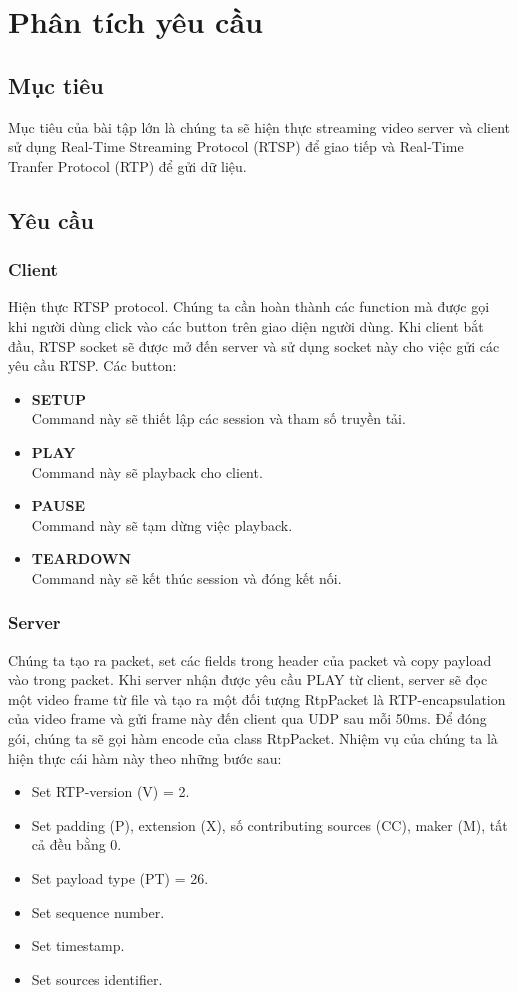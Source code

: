 \documentclass[12pt,a4paper]{article}
\begin{document}
\section{Phân tích yêu cầu}
\subsection{Mục tiêu}
Mục tiêu của bài tập lớn là chúng ta sẽ hiện thực streaming video server và client sử dụng Real-Time Streaming Protocol (RTSP) để giao tiếp và Real-Time Tranfer Protocol (RTP) để gửi dữ liệu.
\subsection{Yêu cầu}
\subsubsection{Client}
Hiện thực RTSP protocol. Chúng ta cần hoàn thành các function mà được gọi khi người dùng click vào các button trên giao diện người dùng. Khi client bắt đầu, RTSP socket sẽ được mở đến server và sử dụng socket này cho việc gửi các yêu cầu RTSP. Các button: 
\begin{itemize}
\item \textbf{SETUP} \\Command này sẽ thiết lập các session và tham số truyền tải.
\item \textbf{PLAY} \\Command này sẽ playback cho client.
\item \textbf{PAUSE} \\Command này sẽ tạm dừng việc playback.
\item \textbf{TEARDOWN} \\Command này sẽ kết thúc session và đóng kết nối.
\end{itemize}
\subsubsection{Server}
Chúng ta tạo ra packet, set các fields trong header của packet và copy payload vào trong packet. Khi server nhận được yêu cầu PLAY từ client, server sẽ đọc một video frame từ file và  tạo ra một đối tượng RtpPacket là RTP-encapsulation của video frame  và gửi frame này  đến client qua UDP sau mỗi 50ms. Để đóng gói, chúng ta sẽ gọi hàm encode của class RtpPacket. Nhiệm vụ của chúng ta là hiện thực cái hàm này theo những bước sau:
\begin{itemize}
\item Set RTP-version (V) = 2.
\item Set padding (P), extension (X), số contributing sources (CC), maker (M), tất cả đều bằng 0.
\item Set payload type (PT) = 26.
\item Set sequence number.
\item Set timestamp.
\item Set sources identifier.  
\end{itemize}
\end{document}
